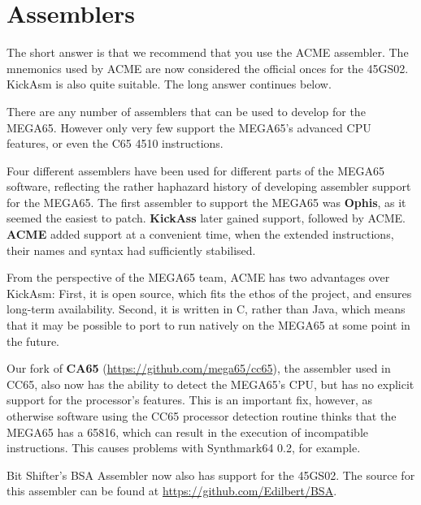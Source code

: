\chapter{Assemblers}

The short answer is that we recommend that you use the ACME
assembler.  The mnemonics used by ACME are now considered the official
onces for the 45GS02.  KickAsm is also quite suitable. The long answer continues below.

There are any number of assemblers that can be used to develop for the
MEGA65.  However only very few support the MEGA65's advanced CPU
features, or even the C65 4510 instructions.

Four different
assemblers have been used for different parts of the MEGA65 software,
reflecting the rather haphazard history of developing assembler
support for the MEGA65.  The first assembler to support the MEGA65 was
{\bf Ophis}, as it seemed the easiest to patch.  {\bf KickAss} later gained
support, followed by ACME. {\bf ACME} added support at a convenient time, when
the extended instructions, their names and syntax had sufficiently stabilised.

From the perspective of the MEGA65 team, ACME has two advantages over KickAsm:
First, it is open source, which fits the ethos of the project, and ensures long-term
availability. Second, it is written in C, rather than Java, which means that
it may be possible to port to run natively on the MEGA65 at some point in
the future.

Our fork of {\bf CA65} (\url{https://github.com/mega65/cc65}), the assembler
used in CC65, also now has the ability 
to detect the MEGA65's CPU, but has no explicit support for the
processor's features.  This is an important fix, however, as otherwise
software using the CC65 processor detection routine thinks that the
MEGA65 has a 65816, which can result in the execution of incompatible
instructions. This causes problems with Synthmark64 0.2, for example.

Bit Shifter's BSA Assembler now also has support for the 45GS02.  The source
for this assembler can be found at \url{https://github.com/Edilbert/BSA}.
